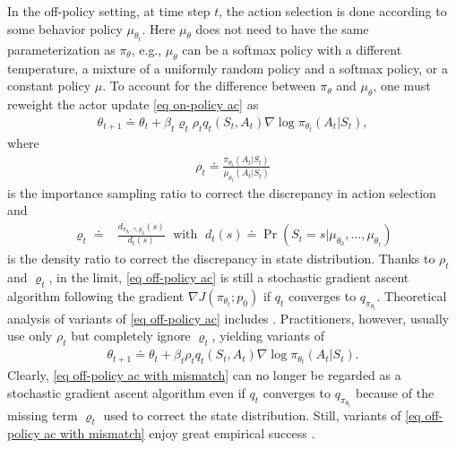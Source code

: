 \documentclass[twoside,11pt]{article}
\numberwithin{assucounter}{section}
\begin{document}
In the off-policy setting,
at time step $t$,
the action selection is done according to some behavior policy $\mu_{\theta_t}$.
Here $\mu_\theta$ does not need to have the same parameterization as $\pi_\theta$,
e.g.,
$\mu_\theta$ can be a softmax policy with a different temperature,
a mixture of a uniformly random policy and a softmax policy,
or a constant policy $\mu$.
To account for the difference between $\pi_\theta$ and $\mu_\theta$,
one must reweight the actor update \eqref{eq on-policy ac} as 
\begin{align}
  \label{eq off-policy ac}
  \theta_{t+1} \doteq \theta_t + \beta_t \varrho_t \rho_t q_t(S_t, A_t) \nabla \log \pi_{\theta_t}(A_t | S_t),
\end{align}
where 
\begin{align}
  \rho_t \doteq \frac{\pi_{\theta_t}(A_t | S_t)}{\mu_{\theta_t}(A_t | S_t)}
\end{align}
is the importance sampling ratio to correct the discrepancy in action selection and
\begin{align}
  \varrho_t \doteq& \frac{d_{\pi_{\theta_t}, \gamma, p_0}(s)}{d_t(s)} \;\text{ with }\;
  d_t(s) \doteq {\Pr(S_t = s | \mu_{\theta_0}, \dots, \mu_{\theta_t})}
\end{align}
is the density ratio to correct the discrepancy in state distribution.
Thanks to $\rho_t$ and $\varrho_t$,
in the limit,
\eqref{eq off-policy ac} is still a stochastic gradient ascent algorithm following the gradient $\nabla J(\pi_{\theta_t}; p_0)$ if $q_t$ converges to $q_{\pi_{\theta_t}}$.
Theoretical analysis of variants of \eqref{eq off-policy ac} includes \citet{liu2019off,zhang2019provably,huang2021convergence,xu2021doubly}.
Practitioners,
however,
usually use only $\rho_t$ but completely ignore $\varrho_t$,
yielding variants of
\begin{align}
  \label{eq off-policy ac with mismatch}
  \theta_{t+1} \doteq \theta_t + \beta_t \rho_t q_t(S_t, A_t) \nabla \log \pi_{\theta_t}(A_t | S_t).
\end{align}
Clearly, 
\eqref{eq off-policy ac with mismatch} can no longer be regarded as a stochastic gradient ascent algorithm even if $q_t$ converges to $q_{\pi_{\theta_t}}$ because of the missing term $\varrho_t$ used to correct the state distribution.
Still, variants of \eqref{eq off-policy ac with mismatch} enjoy great empirical success \citep{wang2016sample,espeholt2018impala,vinyals2019grandmaster,schmitt2020off,zahavy2020self}.
\end{document}
